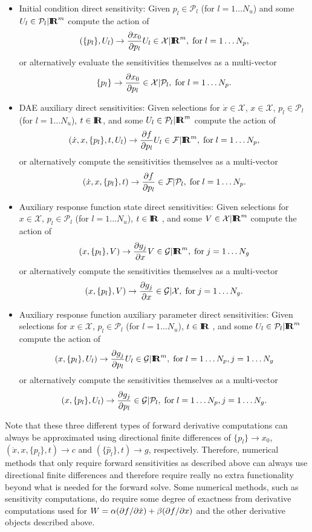 \documentclass[pdf,ps2pdf,11pt]{SANDreport}
\begin{document}
\begin{itemize}

{}\item Initial condition direct sensitivity: Given $p_l\in\mathcal{P}_l$ (for
$l=1\ldots{}N_u$) and some $U_l\in\mathcal{P}_l|\mbox{\textbf{I}}\hspace{-0.6ex}\mbox{\textbf{R}}^m$ compute the action of
\[
(\{p_l\},U_l) {}\rightarrow \displaystyle{\frac{\partial x_0}{\partial p_l}} U_l \in \mathcal{X}|\mbox{\textbf{I}}\hspace{-0.6ex}\mbox{\textbf{R}}^m,
\; \mbox{for} \; l = 1 {}\ldots N_p,
\]
or alternatively evaluate the sensitivities themselves as a multi-vector
\[
\{p_l\} {}\rightarrow \displaystyle{\frac{\partial x_0}{\partial p_l}} \in \mathcal{X}|\mathcal{P}_l,
\; \mbox{for} \; l = 1 {}\ldots N_p.
\]

{}\item DAE auxiliary direct sensitivities: Given selections for
$\dot{x}\in\mathcal{X}$, $x\in\mathcal{X}$, $p_l\in\mathcal{P}_l$ (for
$l=1\ldots{}N_u$), $t\in\mbox{\textbf{I}}\hspace{-0.6ex}\mbox{\textbf{R}}$, and some $U_l\in\mathcal{P}_l|\mbox{\textbf{I}}\hspace{-0.6ex}\mbox{\textbf{R}}^m$ compute
the action of
\[
(\dot{x},x,\{p_l\},t,U_l) {}\rightarrow \displaystyle{\frac{\partial f}{\partial p_l}} U_l \in \mathcal{F}|\mbox{\textbf{I}}\hspace{-0.6ex}\mbox{\textbf{R}}^m,
\; \mbox{for} \; l = 1 {}\ldots N_p,
\]
or alternatively compute the sensitivities themselves as a multi-vector
\[
(\dot{x},x,\{p_l\},t) {}\rightarrow \displaystyle{\frac{\partial f}{\partial p_l}} \in \mathcal{F}|\mathcal{P}_l,
\; \mbox{for} \; l = 1 {}\ldots N_p.
\]

{}\item Auxiliary response function state direct sensitivities: Given
selections for $x\in\mathcal{X}$, $p_l\in\mathcal{P}_l$ (for
$l=1\ldots{}N_u$), $t\in\mbox{\textbf{I}}\hspace{-0.6ex}\mbox{\textbf{R}}$ , and some $V\in\mathcal{X}|\mbox{\textbf{I}}\hspace{-0.6ex}\mbox{\textbf{R}}^m$
compute the action of
\[
(x,\{p_l\},V) {}\rightarrow \displaystyle{\frac{\partial g_j}{\partial x}} V \in \mathcal{G}|\mbox{\textbf{I}}\hspace{-0.6ex}\mbox{\textbf{R}}^m,
\; \mbox{for} \; j = 1 \ldots N_g
\]
or alternatively compute the sensitivities themselves as a multi-vector
\[
(x,\{p_l\},V) {}\rightarrow \displaystyle{\frac{\partial g_j}{\partial x}} \in \mathcal{G}|\mathcal{X},
\; \mbox{for} \; j = 1 \ldots N_g.
\]

{}\item Auxiliary response function auxiliary parameter direct
sensitivities: Given selections for $x\in\mathcal{X}$,
$p_l\in\mathcal{P}_l$ (for $l=1\ldots{}N_u$), $t\in\mbox{\textbf{I}}\hspace{-0.6ex}\mbox{\textbf{R}}$ , and some
$U_l\in\mathcal{P}_l|\mbox{\textbf{I}}\hspace{-0.6ex}\mbox{\textbf{R}}^m$ compute the action of
\[
(x,\{p_l\},U_l) {}\rightarrow \displaystyle{\frac{\partial g_j}{\partial p_l}} U_l \in \mathcal{G}|\mbox{\textbf{I}}\hspace{-0.6ex}\mbox{\textbf{R}}^m,
\; \mbox{for} \; l = 1 {}\ldots N_p, j = 1 \ldots N_g
\]
or alternatively compute the sensitivities themselves as a multi-vector
\[
(x,\{p_l\},U_l) {}\rightarrow \displaystyle{\frac{\partial g_j}{\partial p_l}} \in \mathcal{G}|\mathcal{P}_l,
\; \mbox{for} \; l = 1 {}\ldots N_p, j = 1 \ldots N_g.
\]

\end{itemize}

Note that these three different types of forward derivative computations can
always be approximated using directional finite differences of $\{p_l\}
{}\rightarrow x_0$, $(\dot{x},x,\{p_l\},t) {}\rightarrow c$ and
$(\{\hat{p}_l\},t) {}\rightarrow g$, respectively.  Therefore, numerical
methods that only require forward sensitivities as described above can always
use directional finite differences and therefore require really no extra
functionality beyond what is needed for the forward solve.  Some numerical
methods, such as sensitivity computations, do require some degree of exactness
from derivative computations used for $W = {}\alpha (\partial f / \partial \dot{x}) +
{}\beta (\partial f / \partial x)$ and the other derivative objects described above.
\end{document}
